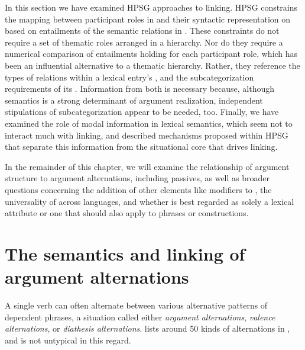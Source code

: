 \documentclass[output=paper
 	        ,biblatex
                ,babelshorthands
                ,newtxmath
                ,draftmode
                ,colorlinks, citecolor=brown
]{langscibook}
\begin{document}
In this section we have examined HPSG approaches to linking.  HPSG constrains the mapping between
participant roles in
 and their syntactic representation on \argst based on entailments of the semantic
relations in .  These constraints do not require a set of thematic roles arranged in a
hierarchy.  Nor do they require a numerical comparison of entailments holding for each participant
role, which has been an influential alternative to a thematic hierarchy.  Rather, they reference the
types of relations within a lexical entry's , and the subcategorization requirements of
its \argst.  Information from both is necessary because, although semantics is a strong determinant
of argument realization, independent stipulations of subcategorization appear to be needed, too.
Finally, we have examined the role of modal information in lexical semantics, which seem not to
interact much with linking, and described mechanisms proposed within HPSG that separate this
information from the situational core that drives linking.

In the remainder of this chapter, we will examine the relationship of argument structure to argument
alternations, including passives, as well as broader questions concerning the addition of other
elements like modifiers to \argst, the universality of \argst across languages, and whether \argst
is best regarded as solely a lexical attribute or one that should also apply to phrases or
constructions.


\section{The semantics and linking of argument alternations}
\label{alternations}
A single verb can often alternate between
 various alternative patterns of dependent phrases, a situation called either 
\emph{argument alternations},
\emph{valence alternations}, or \emph{diathesis alternations}.
\citet{Levin1993} lists around 50 kinds of alternations in , and  is not untypical in this regard.

%
\end{document}
